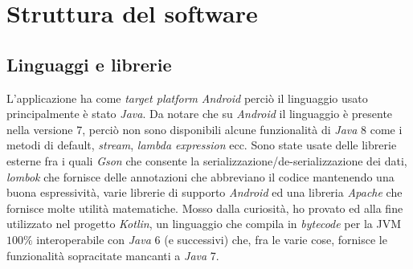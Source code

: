\chapter{Struttura del software}

\section{Linguaggi e librerie}
L'applicazione ha come \textit{target platform} \textit{Android} perci\`o il linguaggio usato principalmente \`e stato \textit{Java}. Da notare che su \textit{Android} il linguaggio \`e presente nella versione 7, perci\`o non sono disponibili alcune funzionalit\`a di \textit{Java} 8 come i metodi di default, \textit{stream}, \textit{lambda expression} ecc. Sono state usate delle librerie esterne fra i quali \textit{Gson} che consente la serializzazione/de-serializzazione dei dati, \textit{lombok} che fornisce delle annotazioni che abbreviano il codice mantenendo una buona espressivit\`a, varie librerie di supporto \textit{Android} ed una libreria \textit{Apache} che fornisce molte utilit\`a matematiche. Mosso dalla curiosit\`a, ho provato ed alla fine utilizzato nel progetto \textit{Kotlin}, un linguaggio che compila in \textit{bytecode} per la JVM $100 \%$ interoperabile con \textit{Java} 6 (e successivi) che, fra le varie cose, fornisce le funzionalit\`a sopracitate mancanti a \textit{Java} 7.

